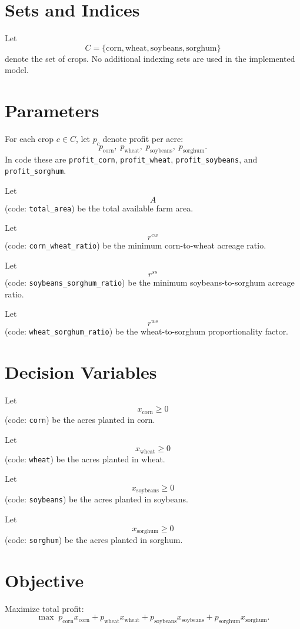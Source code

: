 \section*{Sets and Indices}

Let
\[
C = \{\text{corn},\text{wheat},\text{soybeans},\text{sorghum}\}
\]
denote the set of crops. No additional indexing sets are used in the implemented model.

\section*{Parameters}

For each crop \(c \in C\), let \(p_c\) denote profit per acre:
\[
p_{\text{corn}},\; p_{\text{wheat}},\; p_{\text{soybeans}},\; p_{\text{sorghum}}.
\]
In code these are
\texttt{profit\_corn}, \texttt{profit\_wheat}, \texttt{profit\_soybeans}, and \texttt{profit\_sorghum}.

Let
\[
A
\]
(code: \texttt{total\_area}) be the total available farm area.

Let
\[
r^{cw}
\]
(code: \texttt{corn\_wheat\_ratio}) be the minimum corn-to-wheat acreage ratio.

Let
\[
r^{ss}
\]
(code: \texttt{soybeans\_sorghum\_ratio}) be the minimum soybeans-to-sorghum acreage ratio.

Let
\[
r^{ws}
\]
(code: \texttt{wheat\_sorghum\_ratio}) be the wheat-to-sorghum proportionality factor.

\section*{Decision Variables}

Let
\[
x_{\text{corn}} \ge 0
\]
(code: \texttt{corn}) be the acres planted in corn.

Let
\[
x_{\text{wheat}} \ge 0
\]
(code: \texttt{wheat}) be the acres planted in wheat.

Let
\[
x_{\text{soybeans}} \ge 0
\]
(code: \texttt{soybeans}) be the acres planted in soybeans.

Let
\[
x_{\text{sorghum}} \ge 0
\]
(code: \texttt{sorghum}) be the acres planted in sorghum.

\section*{Objective}

Maximize total profit:
\[
\max \;
p_{\text{corn}} x_{\text{corn}}
+ p_{\text{wheat}} x_{\text{wheat}}
+ p_{\text{soybeans}} x_{\text{soybeans}}
+ p_{\text{sorghum}} x_{\text{sorghum}}.
\]

